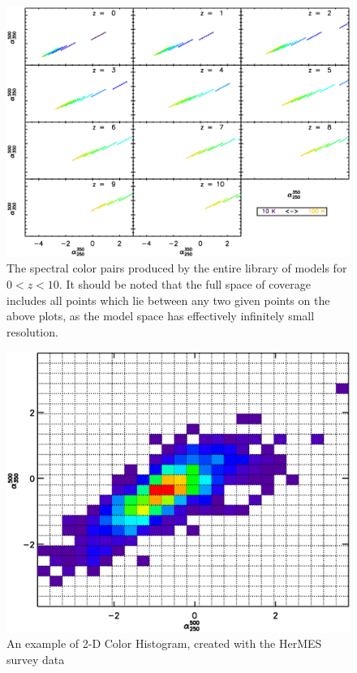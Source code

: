 \documentclass[twocolumn,letterpaper,10pt]{article}
\begin{document}
\begin{figure}
  \includegraphics[width=\textwidth]{template_colors.eps}
  \caption{The spectral color pairs produced by the entire library of models for $0<z<10$. It should be noted that the full space of coverage includes all points which lie between any two given points on the above plots, as the model space has effectively infinitely small resolution.}
  \label{slib_color}
\end{figure}

\begin{figure}
  \includegraphics[width=\textwidth]{obs_color_hist.eps}
  \caption{An example of 2-D Color Histogram, created with the HerMES survey data}
  \label{fig:hist1}
\end{figure}
\end{document}
